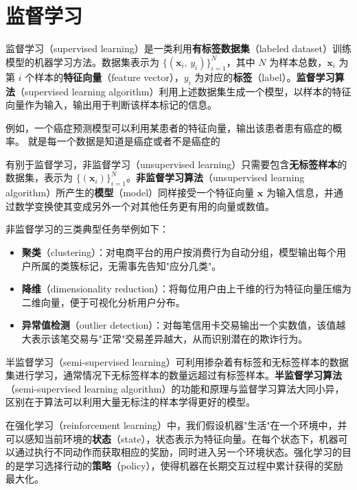 \section{监督学习}
\begin{definition}[监督学习]
监督学习（supervised learning）是一类利用\textbf{有标签数据集}（labeled dataset）训练模型的机器学习方法。数据集表示为 $\{(\boldsymbol{x}_i,\, y_i)\}_{i=1}^{N}$，其中 $N$ 为样本总数，$\boldsymbol{x}_i$ 为第 $i$ 个样本的\textbf{特征向量}（feature vector），$y_i$ 为对应的\textbf{标签}（label）。\textbf{监督学习算法}（supervised learning algorithm）利用上述数据集生成一个模型，以样本的特征向量作为输入，输出用于判断该样本标记的信息。
\end{definition}
例如，一个癌症预测模型可以利用某患者的特征向量，输出该患者患有癌症的概率。
就是每一个数据是知道是癌症或者不是癌症的
\begin{definition}[非监督学习]
有别于监督学习，非监督学习（unsupervised learning）只需要包含\textbf{无标签样本}的数据集，表示为 $\{(\boldsymbol{x}_i)\}_{i=1}^{N}$。\textbf{非监督学习算法}（unsupervised learning algorithm）所产生的\textbf{模型}（model）同样接受一个特征向量 $\boldsymbol{x}$ 为输入信息，并通过数学变换使其变成另外一个对其他任务更有用的向量或数值。
\end{definition}
\begin{note}
非监督学习的三类典型任务举例如下：
\begin{itemize}
    \item \textbf{聚类}（clustering）：对电商平台的用户按消费行为自动分组，模型输出每个用户所属的类簇标记，无需事先告知"应分几类"。
    \item \textbf{降维}（dimensionality reduction）：将每位用户由上千维的行为特征向量压缩为二维向量，便于可视化分析用户分布。
    \item \textbf{异常值检测}（outlier detection）：对每笔信用卡交易输出一个实数值，该值越大表示该笔交易与"正常"交易差异越大，从而识别潜在的欺诈行为。
\end{itemize}
\end{note}
\begin{definition}[半监督学习]
半监督学习（semi-supervised learning）可利用掺杂着有标签和无标签样本的数据集进行学习，通常情况下无标签样本的数量远超过有标签样本。\textbf{半监督学习算法}（semi-supervised learning algorithm）的功能和原理与监督学习算法大同小异，区别在于算法可以利用大量无标注的样本学得更好的模型。
\end{definition}
\begin{definition}[强化学习]
在强化学习（reinforcement learning）中，我们假设机器"生活"在一个环境中，并可以感知当前环境的\textbf{状态}（state），状态表示为特征向量。在每个状态下，机器可以通过执行不同动作而获取相应的奖励，同时进入另一个环境状态。强化学习的目的是学习选择行动的\textbf{策略}（policy），使得机器在长期交互过程中累计获得的奖励最大化。
\end{definition}

